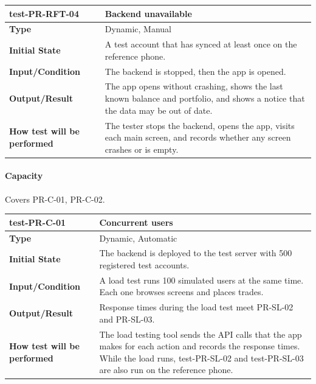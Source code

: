 \documentclass[12pt, titlepage]{article}
\begin{document}
\vspace{1em}

\noindent\begin{tabularx}{\textwidth}{>{\raggedright\arraybackslash}p{3.5cm}X}
  \toprule
  \textbf{test-PR-RFT-04} & \textbf{Backend unavailable}\\
  \midrule
  \textbf{Type} & Dynamic, Manual\\
  \textbf{Initial State} & A test account that has synced at least once on the reference phone.\\
  \textbf{Input/Condition} & The backend is stopped, then the app is opened.\\
  \textbf{Output/Result} & The app opens without crashing, shows the last known balance and portfolio, and shows a notice that the data may be out of date.\\
  \textbf{How test will be performed} & The tester stops the backend, opens the app, visits each main screen, and records whether any screen crashes or is empty.\\
  \bottomrule
\end{tabularx}

\paragraph{Capacity}

Covers PR-C-01, PR-C-02.

\noindent\begin{tabularx}{\textwidth}{>{\raggedright\arraybackslash}p{3.5cm}X}
  \toprule
  \textbf{test-PR-C-01} & \textbf{Concurrent users}\\
  \midrule
  \textbf{Type} & Dynamic, Automatic\\
  \textbf{Initial State} & The backend is deployed to the test server with 500 registered test accounts.\\
  \textbf{Input/Condition} & A load test runs 100 simulated users at the same time. Each one browses screens and places trades.\\
  \textbf{Output/Result} & Response times during the load test meet PR-SL-02 and PR-SL-03.\\
  \textbf{How test will be performed} & The load testing tool sends the API calls that the app makes for each action and records the response times. While the load runs, test-PR-SL-02 and test-PR-SL-03 are also run on the reference phone.\\
  \bottomrule
\end{tabularx}
\end{document}
